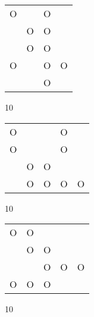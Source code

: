 \begin{tabular}{|m{0.2cm}m{0.2cm}m{0.2cm}m{0.2cm}|}\hline
O& &O& \\
 &O&O& \\
 &O&O& \\
O& &O&O\\
 & &O& \\
\hline\end{tabular}10
\begin{tabular}{|m{0.2cm}m{0.2cm}m{0.2cm}m{0.2cm}m{0.2cm}|}\hline
O& & &O& \\
O& & &O& \\
 &O&O& & \\
 &O&O&O&O\\
\hline\end{tabular}10
\begin{tabular}{|m{0.2cm}m{0.2cm}m{0.2cm}m{0.2cm}m{0.2cm}|}\hline
O&O& & & \\
 &O&O& & \\
 & &O&O&O\\
O&O&O& & \\
\hline\end{tabular}10

